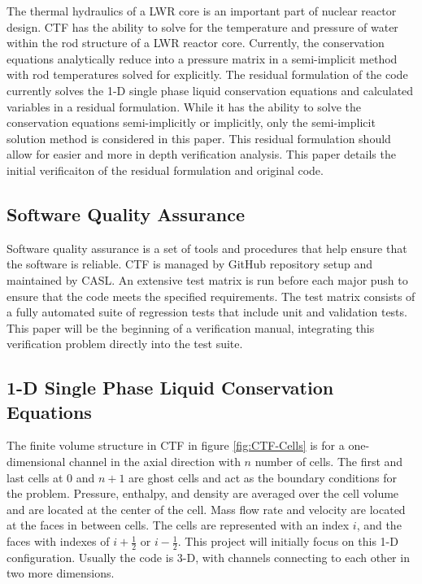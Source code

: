 \documentclass{mc2015}
\begin{document}
The thermal hydraulics of a LWR core is an important part of nuclear
reactor design. CTF has the ability to solve for the temperature and pressure
of water within the rod structure of a LWR reactor core. Currently, the conservation
equations analytically reduce into a pressure matrix in a semi-implicit
method with rod temperatures solved for explicitly. The residual formulation of
the code currently solves the 1-D single phase liquid conservation equations and
calculated variables in a residual formulation. While it has the ability to
solve the conservation equations semi-implicitly or implicitly, only the
semi-implicit solution method is considered in this paper. This residual
formulation should allow for easier and more in depth verification  analysis.
This paper details the initial verificaiton of the residual formulation and
original code.

\subsection{Software Quality Assurance}

Software quality assurance is a set of tools and procedures that help
ensure that the software is reliable. CTF is managed by GitHub repository
setup and maintained by CASL. An extensive test matrix is run before each major
push to ensure that the code meets the specified requirements. The test matrix
consists of a fully automated suite of regression tests that include unit and
validation tests. This paper will be the beginning of a verification manual,
integrating this verification problem directly into the test suite.

\subsection{1-D Single Phase Liquid Conservation Equations}

The finite volume structure in CTF in figure \ref{fig:CTF-Cells} is for a
one-dimensional channel in the axial direction with $n$ number of cells. The
first and last cells at 0 and $n+1$ are ghost cells and act as the boundary
conditions for the problem. Pressure, enthalpy, and density are averaged over
the cell volume and are located at the center of the cell. Mass flow rate and
velocity are located at the faces in between cells. The cells  are represented
with an index $i$, and the faces with indexes of $i + \frac{1}{2}$ or 
$i-\frac{1}{2}$. This project will initially focus on this 1-D configuration.
Usually the code  is 3-D,  with channels connecting to each other in two more 
dimensions.
\end{document}
